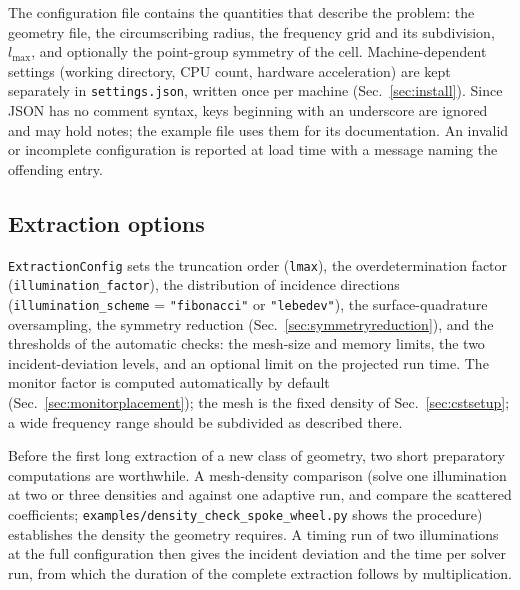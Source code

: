 \documentclass[11pt]{article}
\begin{document}
The configuration file contains the quantities that describe the
problem: the geometry file, the circumscribing radius, the frequency
grid and its subdivision, $l_{\max}$, and optionally the point-group
symmetry of the cell.  Machine-dependent settings (working directory,
CPU count, hardware acceleration) are kept separately in
\texttt{settings.json}, written once per machine
(Sec.~\ref{sec:install}).  Since JSON has no comment syntax, keys
beginning with an underscore are ignored and may hold notes; the
example file uses them for its documentation.  An invalid or
incomplete configuration is reported at load time with a message
naming the offending entry.

\subsection{Extraction options}
\texttt{ExtractionConfig} sets the truncation order (\texttt{lmax}),
the overdetermination factor (\texttt{illumination\_factor}), the
distribution of incidence directions (\texttt{illumination\_scheme} =
\texttt{"fibonacci"} or \texttt{"lebedev"}), the surface-quadrature
oversampling, the symmetry reduction
(Sec.~\ref{sec:symmetryreduction}), and the thresholds of the
automatic checks: the mesh-size and memory limits, the two
incident-deviation levels, and an optional limit on the projected run
time.  The monitor factor is computed automatically by default
(Sec.~\ref{sec:monitorplacement}); the mesh is the fixed density of
Sec.~\ref{sec:cstsetup}; a wide frequency range should be subdivided
as described there.

Before the first long extraction of a new class of geometry, two short
preparatory computations are worthwhile.  A mesh-density comparison
(solve one illumination at two or three densities and against one
adaptive run, and compare the scattered coefficients;
\texttt{examples/density\_check\_spoke\_wheel.py} shows the procedure)
establishes the density the geometry requires.  A timing run of two
illuminations at the full configuration then gives the incident
deviation and the time per solver run, from which the duration of the
complete extraction follows by multiplication.
\end{document}
